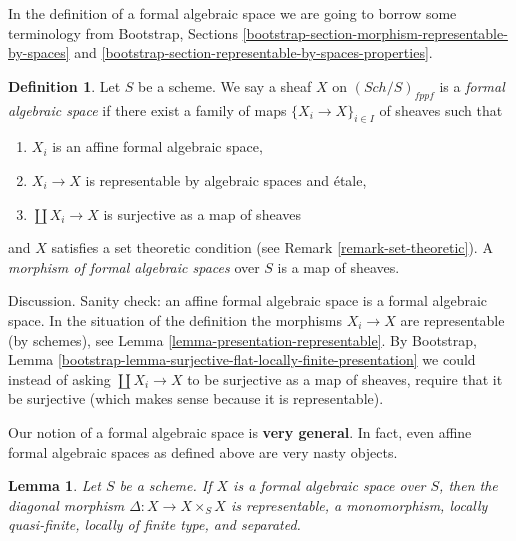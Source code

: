 \documentclass{stacks-project}
\theoremstyle{plain}
\newtheorem{lemma}[subsection]{Lemma}
\theoremstyle{definition}
\newtheorem{definition}[subsection]{Definition}
\theoremstyle{remark}
\numberwithin{equation}{subsection}
\def\Sch{\mathit{Sch}}
\begin{document}
\medskip\noindent
In the definition of a formal algebraic space we are going to
borrow some terminology from
Bootstrap, Sections
\ref{bootstrap-section-morphism-representable-by-spaces} and
\ref{bootstrap-section-representable-by-spaces-properties}.

\begin{definition}
\label{definition-formal-algebraic-space}
Let $S$ be a scheme. We say a sheaf $X$ on $(\Sch/S)_{fppf}$ is a
{\it formal algebraic space} if there exist a family of maps
$\{X_i \to X\}_{i \in I}$ of sheaves such that
\begin{enumerate}
\item $X_i$ is an affine formal algebraic space,
\item $X_i \to X$ is representable by algebraic spaces and \'etale,
\item $\coprod X_i \to X$ is surjective as a map of sheaves
\end{enumerate}
and $X$ satisfies a set theoretic condition
(see Remark \ref{remark-set-theoretic}). A
{\it morphism of formal algebraic spaces}
over $S$ is a map of sheaves.
\end{definition}

\noindent
Discussion. Sanity check: an affine formal algebraic space is
a formal algebraic space. In the situation of the definition
the morphisms $X_i \to X$ are representable (by schemes), see
Lemma \ref{lemma-presentation-representable}.
By Bootstrap, Lemma
\ref{bootstrap-lemma-surjective-flat-locally-finite-presentation}
we could instead of asking $\coprod X_i \to X$
to be surjective as a map of sheaves, require that it be
surjective (which makes sense because it is representable).

\medskip\noindent
Our notion of a formal algebraic space is {\bf very general}.
In fact, even affine formal algebraic spaces as defined above
are very nasty objects.

\begin{lemma}
\label{lemma-diagonal-formal-algebraic-space}
Let $S$ be a scheme. If $X$ is a formal algebraic space over
$S$, then the diagonal morphism $\Delta : X \to X \times_S X$
is representable, a monomorphism, locally quasi-finite,
locally of finite type, and separated.
\end{lemma}
\end{document}
